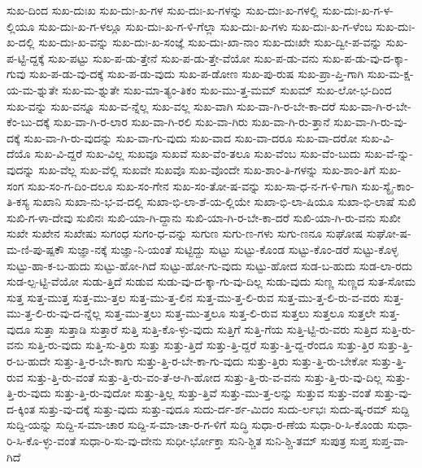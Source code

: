 {ಸುಖ-ದಿಂದ
ಸುಖ-ದುಃಖ
ಸುಖ-ದುಃ-ಖ-ಗಳ
ಸುಖ-ದುಃ-ಖ-ಗಳನ್ನು
ಸುಖ-ದುಃ-ಖ-ಗಳಲ್ಲಿ
ಸುಖ-ದುಃ-ಖ-ಗ-ಳ-ಲ್ಲಿಯೂ
ಸುಖ-ದುಃ-ಖ-ಗ-ಳಲ್ಲೂ
ಸುಖ-ದುಃ-ಖ-ಗ-ಳಿ-ಗೆಲ್ಲಾ
ಸುಖ-ದುಃ-ಖ-ಗಳು
ಸುಖ-ದುಃ-ಖ-ಗ-ಳೆಂಬ
ಸುಖ-ದುಃ-ಖ-ದಲ್ಲಿ
ಸುಖ-ದುಃ-ಖ-ವನ್ನು
ಸುಖ-ದುಃ-ಖ-ಸಂಜ್ಞೆ
ಸುಖ-ದುಃ-ಖಾ-ನಾಂ
ಸುಖ-ದುಃಖೇ
ಸುಖ-ದ್ವೀ-ಪ-ವನ್ನು
ಸುಖ-ಪ-ಟ್ಟಿ-ದ್ದಕ್ಕೆ
ಸುಖ-ಪಟ್ಟು
ಸುಖ-ಪ-ಡು-ತ್ತೇನೆ
ಸುಖ-ಪ-ಡು-ತ್ತೇ-ವೆಯೋ
ಸುಖ-ಪ-ಡು-ವನು
ಸುಖ-ಪ-ಡು-ವು-ದ-ಕ್ಕಾ-ಗುವು
ಸುಖ-ಪ-ಡು-ವು-ದಕ್ಕೆ
ಸುಖ-ಪ-ಡು-ವುದು
ಸುಖ-ಪ-ಡೋಣ
ಸುಖ-ಪು-ರುಷ
ಸುಖ-ಪ್ರಾ-ಪ್ತಿ-ಗಾಗಿ
ಸುಖ-ಮ-ಕ್ಷ-ಯ-ಮ-ಶ್ನುತೇ
ಸುಖ-ಮ-ಶ್ನುತೇ
ಸುಖ-ಮಾ-ತ್ಯಂ-ತಿಕಂ
ಸುಖ-ಮು-ತ್ತ-ಮಮ್
ಸುಖಮ್
ಸುಖ-ಲೋ-ಭ-ದಿಂದ
ಸುಖ-ವನ್ನು
ಸುಖ-ವನ್ನೂ
ಸುಖ-ವ-ನ್ನೆಲ್ಲ
ಸುಖ-ವಲ್ಲ
ಸುಖ-ವಾಗಿ
ಸುಖ-ವಾ-ಗಿ-ರ-ಬೇ-ಕಾ-ದರೆ
ಸುಖ-ವಾ-ಗಿ-ರ-ಬೇ-ಕೆಂ-ಬು-ದಕ್ಕೆ
ಸುಖ-ವಾ-ಗಿ-ರ-ಲಾರ
ಸುಖ-ವಾ-ಗಿ-ರಲಿ
ಸುಖ-ವಾ-ಗಿರು
ಸುಖ-ವಾ-ಗಿ-ರು-ತ್ತಾನೆ
ಸುಖ-ವಾ-ಗಿ-ರು-ವು-ದಕ್ಕೆ
ಸುಖ-ವಾ-ಗಿ-ರು-ವುದನ್ನು
ಸುಖ-ವಾ-ಗು-ವುದು
ಸುಖ-ವಾದ
ಸುಖ-ವಾ-ದರೂ
ಸುಖ-ವಾ-ದರೋ
ಸುಖ-ವಿ-ದೆಯೊ
ಸುಖ-ವಿ-ದ್ದರೆ
ಸುಖ-ವಿಲ್ಲ
ಸುಖವೂ
ಸುಖವೆ
ಸುಖ-ವೆಂ-ತಲೂ
ಸುಖ-ವೆಂಬ
ಸುಖ-ವೆಂ-ಬುದು
ಸುಖ-ವೆ-ನ್ನು-ವುದನ್ನು
ಸುಖ-ವೆಲ್ಲ
ಸುಖ-ವೆಲ್ಲಿ
ಸುಖವೇ
ಸುಖವೊ
ಸುಖ-ವೊಂದೇ
ಸುಖ-ಶಾಂ-ತಿ-ಗಳನ್ನು
ಸುಖ-ಶಾಂ-ತಿಗೆ
ಸುಖ-ಸಂಗ
ಸುಖ-ಸಂ-ಗ-ದಿಂ-ದಲೂ
ಸುಖ-ಸಂ-ಗೇನ
ಸುಖ-ಸಂ-ತೋ-ಷ-ವನ್ನು
ಸುಖ-ಸಾ-ಧ-ನ-ಗ-ಳಿ-ಗಾಗಿ
ಸುಖ-ಸ್ಯೈ-ಕಾಂ-ತಿ-ಕಸ್ಯ
ಸುಖಾನಿ
ಸುಖಾ-ನು-ಭ-ವ-ದಲ್ಲಿ
ಸುಖಾ-ಭಿ-ಲಾ-ಶೆ-ಯ-ಲ್ಲಿಯೇ
ಸುಖಾ-ಭಿ-ಲಾ-ಷಿಯೂ
ಸುಖಾ-ಭಿ-ಲಾಷೆ
ಸುಖಿ
ಸುಖಿ-ಗ-ಳಾ-ದೇವು
ಸುಖಿನಃ
ಸುಖಿ-ಯಾ-ಗಿ-ದ್ದಾನು
ಸುಖಿ-ಯಾ-ಗಿ-ರ-ಬೇ-ಕಾ-ದರೆ
ಸುಖಿ-ಯಾ-ಗಿ-ರು-ವನು
ಸುಖೀ
ಸುಖೇ
ಸುಖೇನ
ಸುಖೇಷು
ಸುಗಂಧ
ಸುಗಂ-ಧ-ವನ್ನು
ಸುಗುಣ
ಸುಗು-ಣ-ಗಳು
ಸುಗು-ಣನೂ
ಸುಘೋಷ
ಸುಘೋ-ಷ-ಮ-ಣಿ-ಪು-ಷ್ಪಕೌ
ಸುಜ್ಞಾ-ನಕ್ಕೆ
ಸುಜ್ಞಾ-ನಿ-ಯಂತೆ
ಸುಟ್ಟಿದ್ದು
ಸುಟ್ಟು
ಸುಟ್ಟು-ಕೊಂಡ
ಸುಟ್ಟು-ಕೊಂ-ಡರೆ
ಸುಟ್ಟು-ಕೊಳ್ಳ
ಸುಟ್ಟು-ಹಾ-ಕ-ಬ-ಹುದು
ಸುಟ್ಟು-ಹೋ-ಗಿದೆ
ಸುಟ್ಟು-ಹೋ-ಗು-ವುದು
ಸುಟ್ಟು-ಹೋದ
ಸುಡ-ಬ-ಹುದು
ಸುಡ-ಲಾ-ರದು
ಸುಡ-ಲ್ಪ-ಟ್ಟಿ-ವೆಯೋ
ಸುಡು-ತ್ತಿದೆ
ಸುಡುವ
ಸುಡು-ವು-ದ-ಕ್ಕಾ-ಗು-ವು-ದಿಲ್ಲ
ಸುಡು-ವುದು
ಸುಣ್ಣ
ಸುಣ್ಣದ
ಸುತ-ಸೋಮ
ಸುತ್ತ
ಸುತ್ತ-ಮುತ್ತ
ಸುತ್ತ-ಮು-ತ್ತಲ
ಸುತ್ತ-ಮು-ತ್ತ-ಲಿನ
ಸುತ್ತ-ಮು-ತ್ತ-ಲಿ-ರುವ
ಸುತ್ತ-ಮು-ತ್ತ-ಲಿ-ರು-ವ-ವರು
ಸುತ್ತ-ಮು-ತ್ತ-ಲಿ-ರು-ವು-ದ-ನ್ನೆಲ್ಲ
ಸುತ್ತ-ಮು-ತ್ತಲು
ಸುತ್ತ-ಮು-ತ್ತಲೂ
ಸುತ್ತ-ಲಿ-ರುವ
ಸುತ್ತಲು
ಸುತ್ತಲೂ
ಸುತ್ತಲೇ
ಸುತ್ತ-ವುದೂ
ಸುತ್ತಾ
ಸುತ್ತಾಡಿ
ಸುತ್ತಾರೆ
ಸುತ್ತಿ
ಸುತ್ತಿ-ಕೊ-ಳ್ಳು-ವುದು
ಸುತ್ತಿಗೆ
ಸುತ್ತಿ-ಗೆಯ
ಸುತ್ತಿ-ಟ್ಟಿ-ರು-ವರು
ಸುತ್ತಿದ
ಸುತ್ತಿ-ರು-ವನು
ಸುತ್ತಿ-ರು-ವುದು
ಸುತ್ತಿ-ಸು-ತ್ತಿರು
ಸುತ್ತು
ಸುತ್ತು-ತ್ತಿದೆ
ಸುತ್ತು-ತ್ತಿ-ದ್ದರೆ
ಸುತ್ತು-ತ್ತಿ-ದ್ದ-ರೆಂದೂ
ಸುತ್ತು-ತ್ತಿರ
ಸುತ್ತು-ತ್ತಿ-ರ-ಬ-ಹುದೇ
ಸುತ್ತು-ತ್ತಿ-ರ-ಬೇ-ಕಾಗು
ಸುತ್ತು-ತ್ತಿ-ರ-ಬೇ-ಕಾ-ಗು-ವುದು
ಸುತ್ತು-ತ್ತಿರು
ಸುತ್ತು-ತ್ತಿ-ರು-ಬೇಕೋ
ಸುತ್ತು-ತ್ತಿ-ರುವ
ಸುತ್ತು-ತ್ತಿ-ರು-ವಂತೆ
ಸುತ್ತು-ತ್ತಿ-ರು-ವಂ-ತೆ-ಆ-ಗಿ-ಹೋದ
ಸುತ್ತು-ತ್ತಿ-ರು-ವ-ವನು
ಸುತ್ತು-ತ್ತಿ-ರು-ವು-ದಿಲ್ಲ
ಸುತ್ತು-ತ್ತಿ-ರು-ವುದು
ಸುತ್ತು-ತ್ತಿ-ರು-ವುದೋ
ಸುತ್ತು-ತ್ತಿಲ್ಲ
ಸುತ್ತು-ತ್ತಿವೆ
ಸುತ್ತು-ಮು-ತ್ತ-ಲನ್ನು
ಸುತ್ತುವ
ಸುತ್ತು-ವಂತೆ
ಸುತ್ತು-ವು-ದ-ಕ್ಕಿಂತ
ಸುತ್ತು-ವು-ದಕ್ಕೆ
ಸುತ್ತು-ವುದು
ಸುತ್ತು-ವುದೂ
ಸುದು-ರ್ದ-ರ್ಶ-ಮಿದಂ
ಸುದು-ರ್ಲಭಃ
ಸುದು-ಷ್ಕ-ರಮ್
ಸುದ್ದಿ
ಸುದ್ದಿ-ಯನ್ನು
ಸುದ್ದಿ-ಸ-ಮಾ-ಚಾರ
ಸುದ್ದಿ-ಸ-ಮಾ-ಚಾ-ರ-ಗ-ಳಿಗೆ
ಸುದ್ಧಿ
ಸುಧಾ-ರ-ಣೆಯ
ಸುಧಾ-ರಿ-ಸಿ-ಕೊಂಡು
ಸುಧಾ-ರಿ-ಸಿ-ಕೊ-ಳ್ಳು-ವಂತೆ
ಸುಧಾ-ರಿ-ಸು-ವು-ದೇನು
ಸುಧೀ-ರ್ಭೋಕ್ತಾ
ಸುನಿ-ಶ್ಚಿತ
ಸುನಿ-ಶ್ಚಿ-ತಮ್
ಸುಪುತ್ರ
ಸುಪ್ತ
ಸುಪ್ತ-ವಾ-ಗಿದೆ
}
